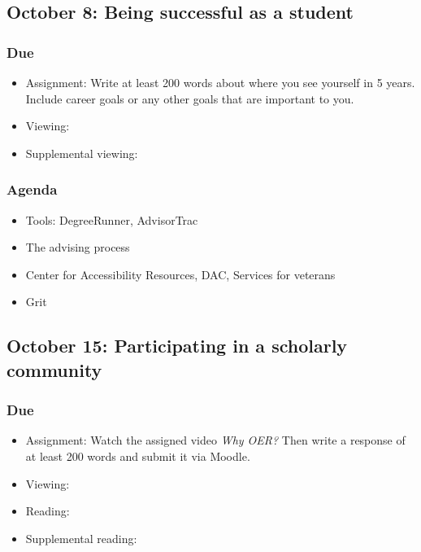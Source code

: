 \documentclass[12pt,article,oneside]{memoir}
\begin{document}
\subsection{October 8: Being successful as a student}
\subsubsection{Due}
\begin{itemize}
 \item Assignment: Write at least 200 words about where you see yourself in 5 years.  Include career goals or any other goals that are important to you.
 \item Viewing: \cite{decipher}
 \item Supplemental viewing: \cite{tannahill} 
\end{itemize}

\subsubsection{Agenda}
\begin{itemize}
\item Tools: DegreeRunner, AdvisorTrac
\item The advising process
\item Center for Accessibility Resources, DAC, Services for veterans
\item Grit

\end{itemize} 



\subsection{October 15: Participating in a scholarly community}
\subsubsection{Due}
\begin{itemize}
 \item Assignment: Watch the assigned video \emph{Why OER?}  Then write a response of at least 200 words and submit it via Moodle. 
 \item Viewing: \cite{oer}
 \item Reading: \cite{wellsley}
 \item Supplemental reading: \cite{oer-dh}
\end{itemize}
\end{document}

